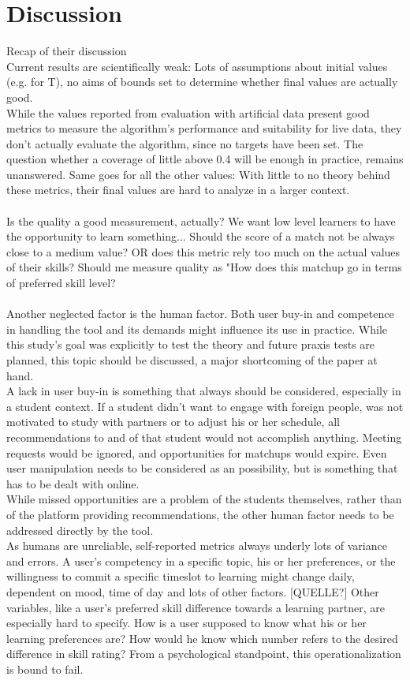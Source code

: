 \documentclass[nochapterpage,bigchapter,linedtoc,longdoc,colorback,accentcolor=tud3b]{tudreport}
\begin{document}
\section{Discussion}
Recap of their discussion\\
Current results are scientifically weak: Lots of assumptions about initial values (e.g. for T), no aims of bounds set to determine whether final values are actually good.\\
While the values reported from evaluation with artificial data present good metrics to measure the algorithm's performance and suitability for live data, they don't actually evaluate the algorithm, since no targets have been set. The question whether a coverage of little above 0.4 will be enough in practice, remains unanswered. Same goes for all the other values: With little to no theory behind these metrics, their final values are hard to analyze in a larger context.\\
\\
Is the quality a good measurement, actually? We want low level learners to have the opportunity to learn something... Should the score of a match not be always close to a medium value? OR does this metric rely too much on the actual values of their skills? Should me measure quality as "How does this matchup go in terms of preferred skill level?\\
\\
Another neglected factor is the human factor. Both user buy-in and competence in handling the tool and its demands might influence its use in practice. While this study's goal was explicitly to test the theory and future praxis tests are planned, this topic should be discussed, a major shortcoming of the paper at hand.\\
A lack in user buy-in is something that always should be considered, especially in a student context. If a student didn't want to engage with foreign people, was not motivated to study with partners or to adjust his or her schedule, all recommendations to and of that student would not accomplish anything. Meeting requests would be ignored, and opportunities for matchups would expire. Even user manipulation needs to be considered as an possibility, but is something that has to be dealt with online.\\
While missed opportunities are a problem of the students themselves, rather than of the platform providing recommendations, the other human factor needs to be addressed directly by the tool.\\
As humans are unreliable, self-reported metrics always underly lots of variance and errors. A user's competency in a specific topic, his or her preferences, or the willingness to commit a specific timeslot to learning might change daily, dependent on mood, time of day and lots of other factors. [QUELLE?] Other variables, like a user's preferred skill difference towards a learning partner, are especially hard to specify. How is a user supposed to know what his or her learning preferences are? How would he know which number refers to the desired difference in skill rating? From a psychological standpoint, this operationalization is bound to fail.\\
\end{document}
